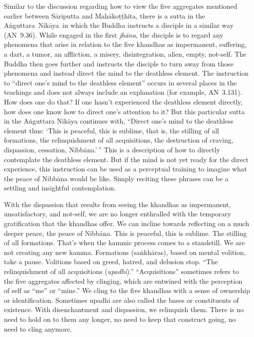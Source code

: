 Similar to the discussion regarding how to view the five aggregates mentioned earlier between Sāriputta and Mahākoṭṭhita, there is a sutta in the \mbox{Aṅguttara Nikāya in} which the Buddha instructs a disciple in a similar way \mbox{(AN 9.36)}. While engaged in the first \emph{jhāna}, the disciple is to regard any phenomena that arise in relation to the five khandhas as impermanent, suffering, a dart, a tumor, an affliction, a misery, disintegration, alien, empty, not-self. The Buddha then goes further and instructs the disciple to turn away from those phenomena and instead direct the mind to the deathless element. The instruction to ``direct one's mind to the deathless element'' occurs in several places in the teachings and does not always include an explanation (for example, \mbox{AN 3.131}). How does one do that? If one hasn't experienced the deathless element directly, how does one know how to direct one's attention to it? But this particular sutta in the Aṅguttara Nikāya continues with, ``Direct one's mind to the deathless element thus: `This is peaceful, this is sublime, that is, the stilling of all formations, the relinquishment of all acquisitions, the destruction of craving, dispassion, cessation, Nibbāna.'\,'' This is a description of how to directly contemplate the deathless element. But if the mind is not yet ready for the direct experience, this instruction can be used as a perceptual training to imagine what the peace of Nibbāna would be like. Simply reciting these phrases can be a settling and insightful contemplation.

With the dispassion that results from seeing the khandhas as impermanent, unsatisfactory, and not-self, we are no longer enthralled with the temporary gratification that the khandhas offer. We can incline towards reflecting on a much deeper peace, the peace of Nibbāna. This is peaceful, this is sublime. The stilling of all formations. That's when the kammic process comes to a standstill. We are not creating any new kamma. Formations (saṅkhāras), based on mental volition, take a pause. Volitions based on greed, hatred, and delusion stop. ``The relinquishment of all acquisitions (\emph{upadhi}).'' ``Acquisitions'' sometimes refers to the five \mbox{aggregates} affected by clinging, which are entwined with the \mbox{perception} of self as ``me'' or ``mine.'' We cling to the five khandhas with a sense of ownership or identification. Sometimes upadhi are also called the bases or constituents of existence. With disenchantment and dispassion, we relinquish them. There is no need to hold on to them any longer, no need to keep that construct going, no need to cling anymore.

